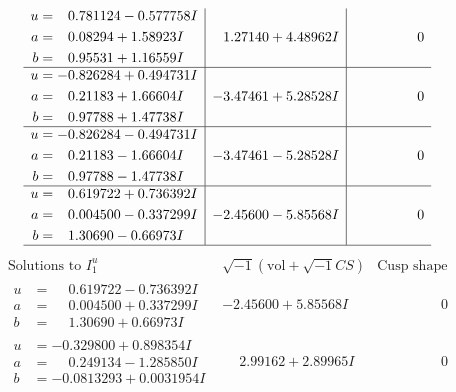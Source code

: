 \documentclass[1p]{elsarticle_modified}
\theoremstyle{definition}
\newcommand{\I}{\sqrt{-1}}
\begin{document}
$$\begin{array}{c|c|c}
\begin{aligned}
u &= \phantom{-}0.781124 - 0.577758 I \\
a &= \phantom{-}0.08294 + 1.58923 I \\
b &= \phantom{-}0.95531 + 1.16559 I\end{aligned}
 & \phantom{-}1.27140 + 4.48962 I & \phantom{-0.000000 } 0 \\ \hline\begin{aligned}
u &= -0.826284 + 0.494731 I \\
a &= \phantom{-}0.21183 + 1.66604 I \\
b &= \phantom{-}0.97788 + 1.47738 I\end{aligned}
 & -3.47461 + 5.28528 I & \phantom{-0.000000 } 0 \\ \hline\begin{aligned}
u &= -0.826284 - 0.494731 I \\
a &= \phantom{-}0.21183 - 1.66604 I \\
b &= \phantom{-}0.97788 - 1.47738 I\end{aligned}
 & -3.47461 - 5.28528 I & \phantom{-0.000000 } 0 \\ \hline\begin{aligned}
u &= \phantom{-}0.619722 + 0.736392 I \\
a &= \phantom{-}0.004500 - 0.337299 I \\
b &= \phantom{-}1.30690 - 0.66973 I\end{aligned}
 & -2.45600 - 5.85568 I & \phantom{-0.000000 } 0\\
 \hline 
 \end{array}$$\newpage$$\begin{array}{c|c|c}  
\text{Solutions to }I^u_{1}& \I (\text{vol} + \sqrt{-1}CS) & \text{Cusp shape}\\
 \hline 
\begin{aligned}
u &= \phantom{-}0.619722 - 0.736392 I \\
a &= \phantom{-}0.004500 + 0.337299 I \\
b &= \phantom{-}1.30690 + 0.66973 I\end{aligned}
 & -2.45600 + 5.85568 I & \phantom{-0.000000 } 0 \\ \hline\begin{aligned}
u &= -0.329800 + 0.898354 I \\
a &= \phantom{-}0.249134 - 1.285850 I \\
b &= -0.0813293 + 0.0031954 I\end{aligned}
 & \phantom{-}2.99162 + 2.89965 I & \phantom{-0.000000 } 0 \\ \hline\begin{aligned}

\end{aligned}
\end{array}$$
\end{document}
